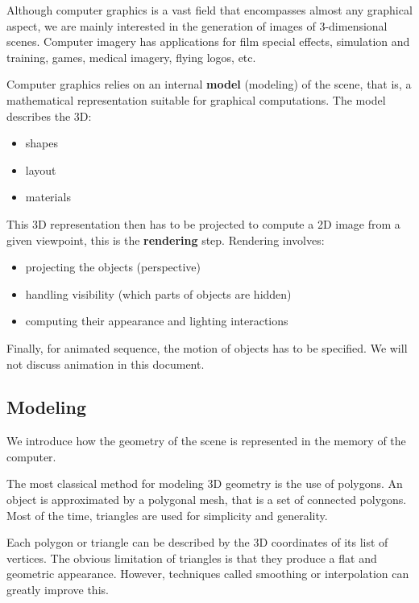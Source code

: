 Although computer graphics is a vast field that encompasses almost any graphical aspect, we are mainly 
interested in the generation of images of 3-dimensional scenes. Computer imagery has applications for film 
special effects, simulation and training, games, medical imagery, flying logos, etc.

Computer  graphics  relies  on  an  internal \textbf{model} (modeling) of  the  scene, that  is,  a  mathematical representation suitable  for  graphical  computations. The  model  describes  the  3D:

\begin{itemize}
\item shapes
\item layout
\item materials
\end{itemize} 

This 3D representation then has to be projected to compute a 2D image from a given viewpoint, this is 
the \textbf{rendering} step.  Rendering  involves:

\begin{itemize}
\item projecting  the  objects  (perspective)
\item handling visibility (which parts of objects are hidden)
\item computing their appearance and lighting interactions
\end{itemize} 

Finally, for animated sequence, the motion of objects has to be specified. We will not discuss animation 
in this document.  

\subsection{Modeling}

We introduce how the geometry of the scene is represented in the memory of the computer. 

The most classical method for modeling 3D geometry is the use of polygons. An object is approximated by a polygonal mesh, that is a set of connected polygons. Most of the time, triangles are used for simplicity and generality.

Each polygon or triangle can be described by the 3D coordinates of its list of vertices. The  obvious limitation  of  triangles  is  that  they  produce  a  flat  and  geometric  appearance.  However,  techniques called smoothing  or interpolation can greatly improve this.

